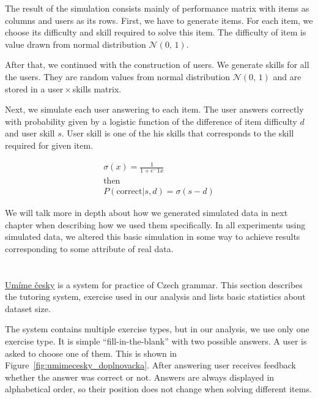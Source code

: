\documentclass[
  print, %
  table,   %
  nolof,     %
  nolot,     %
  nocover,
  color,
  final,
]{fithesis3}
\begin{document}
The result of the simulation consists mainly of performance matrix with items as columns and users as its rows. First, we have to generate items. For each item, we choose its difficulty and skill required to solve this item. The difficulty of item is value drawn from normal distribution $\mathcal{N}(0,\,1)$.

After that, we continued with the construction of users. We generate skills for all the users. They are random values from normal distribution $\mathcal{N}(0,\,1)$ and are stored in a user\,$\times$\,skills matrix.

Next, we simulate each user answering to each item. The user answers correctly with probability given by a logistic function of the difference of item difficulty $d$ and user skill $s$. User skill is one of the his skills that corresponds to the skill required for given item.

\begin{gather*}
\sigma(x) = \frac{1}{1 + e^-1x} \\
\text{then}\\
P(\text{correct}|s, d) = \sigma(s - d)
\end{gather*}

We will talk more in depth about how we generated simulated data in next chapter when describing how we used them specifically. In all experiments using simulated data, we altered this basic simulation in some way to achieve results corresponding to some attribute of real data.


\section{\umimeCesky{}}\label{umime-cesky}


\href{https://umimecesky.cz/}{Umíme česky} is a system for practice of Czech grammar. This section describes the tutoring system, exercise used in our analysis and lists basic statistics about dataset size.

The system contains multiple exercise types, but in our analysis, we use only one exercise type. It is simple ``fill-in-the-blank'' with two possible answers. A user is asked to choose one of them. This is shown in Figure~\ref{fig:umimecesky_doplnovacka}. After answering user receives feedback whether the answer was correct or not. Answers are always displayed in alphabetical order, so their position does not change when solving different items.
\end{document}
